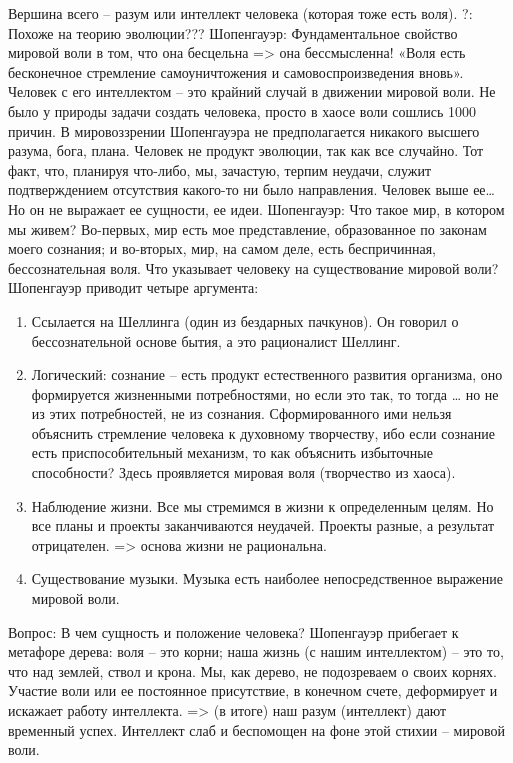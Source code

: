 \documentclass[12pt]{article}
\begin{document}
Вершина всего – разум или интеллект человека (которая тоже есть воля).
?: Похоже на теорию эволюции???
Шопенгауэр: Фундаментальное свойство мировой воли в том, что она бесцельна => она бессмысленна!
«Воля есть бесконечное стремление самоуничтожения и самовоспроизведения вновь».
Человек с его интеллектом – это крайний случай в движении мировой воли. Не было у природы задачи создать
человека, просто в хаосе воли сошлись 1000 причин.
В мировоззрении Шопенгауэра не предполагается никакого высшего разума, бога, плана. Человек не продукт
эволюции, так как все случайно. Тот факт, что, планируя что-либо, мы, зачастую, терпим неудачи, служит
подтверждением отсутствия какого-то ни было направления.
Человек выше ее… Но он не выражает ее сущности, ее идеи.
Шопенгауэр: Что такое мир, в котором мы живем? Во-первых, мир есть мое представление, образованное по
законам моего сознания; и во-вторых, мир, на самом деле, есть беспричинная, бессознательная воля.
Что указывает человеку на существование мировой воли? Шопенгауэр приводит четыре аргумента:
\begin{enumerate}
\item Ссылается на Шеллинга (один из бездарных пачкунов). Он говорил о бессознательной основе бытия, а это
рационалист Шеллинг. 
\item Логический: сознание – есть продукт естественного развития организма, оно формируется жизненными
потребностями, но если это так, то тогда … но не из этих потребностей, не из сознания. Сформированного ими
нельзя объяснить стремление человека к духовному творчеству, ибо если сознание есть приспособительный
механизм, то как объяснить избыточные способности? Здесь проявляется мировая воля (творчество из хаоса). 
\item Наблюдение жизни. Все мы стремимся в жизни к определенным целям. Но все планы и проекты
заканчиваются неудачей. Проекты разные, а результат отрицателен. => основа жизни не рациональна. 
\item Существование музыки. Музыка есть наиболее непосредственное выражение мировой воли.
\end{enumerate}
Вопрос: В чем сущность и положение человека? 
Шопенгауэр прибегает к метафоре дерева: воля – это корни; наша жизнь (с нашим интеллектом) – это то, что
над землей, ствол и крона. Мы, как дерево, не подозреваем о своих корнях. Участие воли или ее постоянное
присутствие, в конечном счете, деформирует и искажает работу интеллекта. => (в итоге) наш разум (интеллект)
дают временный успех. Интеллект слаб и беспомощен на фоне этой стихии – мировой воли.
\end{document}
